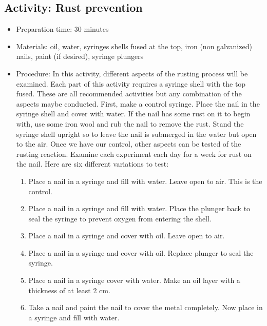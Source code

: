 \begin{itemize}
{\subsection{Activity: Rust prevention}
\begin{itemize}
\item{Preparation time: 30 minutes}
\item{Materials: oil, water, syringes shells fused at the top, iron (non galvanized) nails, paint (if desired), syringe plungers  }
\item{Procedure: In this activity, different aspects of the rusting process will be examined. Each part of this activity requires a syringe shell with the top fused. These are all recommended activities but any combination of the aspects maybe conducted. First, make a control syringe. Place the nail in the syringe shell and cover with water. If the nail has some rust on it to begin with, use some iron wool and rub the nail to remove the rust. Stand the syringe shell upright so to leave the nail is submerged in the water but open to the air. Once we have our control, other aspects can be tested of the rusting reaction. Examine each experiment each day for a week for rust on the nail. Here are six different variations to test:
\begin{enumerate}
\item{Place a nail in a syringe and fill with water. Leave open to air. This is the control.}
\item{Place a nail in a syringe and fill with water. Place the plunger back to seal the syringe to prevent oxygen from entering the shell.}
\item{Place a nail in a syringe and cover with oil. Leave open to air.}
\item{Place a nail in a syringe and cover with oil. Replace plunger to seal the syringe.}
\item{Place a nail in a syringe cover with water. Make an oil layer with a thickness of at least 2 cm.}
\item{Take a nail and paint the nail to cover the metal completely. Now place in a syringe and fill with water.}
\end{enumerate}
}

\end{itemize}}
\end{itemize}
